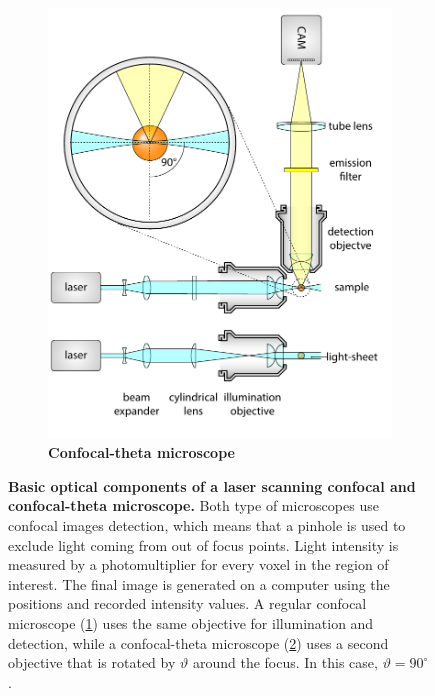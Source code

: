 \documentclass{diploma_style}
\begin{document}
\begin{figure}
\begin{subfigure}[t]{0.49\textwidth}
    \label{fig:confocal}
\end{subfigure}
\begin{subfigure}[t]{0.49\textwidth}
    \centering
    \includegraphics[page=5,width=\textwidth]{figures/1_spim/spim_cyl}
    \caption{\textbf{Confocal-theta microscope}}
    \label{fig:conf-theta}
\end{subfigure}
\caption{\textbf{Basic optical components of a laser scanning confocal and confocal-theta microscope.} Both type of microscopes use confocal images detection, which means that a pinhole is used to exclude light coming from out of focus points. Light intensity is measured by a photomultiplier for every voxel in the region of interest. The final image is generated on a computer using the positions and recorded intensity values. A regular confocal microscope (\ref{fig:confocal}) uses the same objective for illumination and detection, while a confocal-theta microscope (\ref{fig:conf-theta}) uses a second objective that is rotated by $\vartheta$ around the focus. In this case, $\vartheta = 90^\circ$.}
\label{fig:confocals}
\end{figure}
\end{document}
